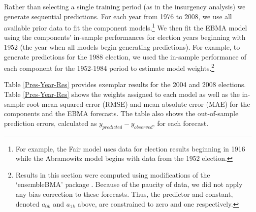 \documentclass[pdftex,12pt,fullpage,oneside]{amsart}
\begin{document}
Rather than selecting a single training period (as in the insurgency
analysis) we generate sequential predictions.  For each year from 1976
to 2008, we use all available prior data to fit the component
models.\footnote{For example, the Fair model uses data for election
  results beginning in 1916 while the Abramowitz model begins with
  data from the 1952 election. }  We then fit the EBMA model using the
components' in-sample performances for election years beginning with
1952 (the year when all models begin generating predictions).  For
example, to generate predictions for the 1988 election, we used the
in-sample performance of each component for the 1952-1984 period to
estimate model weights.\footnote{Results in this section were computed
  using modifications of the `ensembleBMA' package
  \citep{Fraley:2010b, Fraley:Forthcoming}.  Because of the paucity of
  data, we did not apply any bias correction to these forecasts.  Thus,
  the predictor and constant, denoted $a_{0k}$ and $a_{1k}$ above, are
  constrained to zero and one respectively.}

Table \ref{Pres-Year-Res} provides exemplar results for the 2004 and 2008
elections.  Table \ref{Pres-Year-Res} shows the
weights assigned to each model as well as the in-sample root mean
squared error (RMSE) and mean absolute error (MAE) for the components
and the EBMA forecasts.   The table also shows the out-of-sample prediction
errors, calculated as $y_{predicted}-y_{observed}$, for each forecast. 
\end{document}
